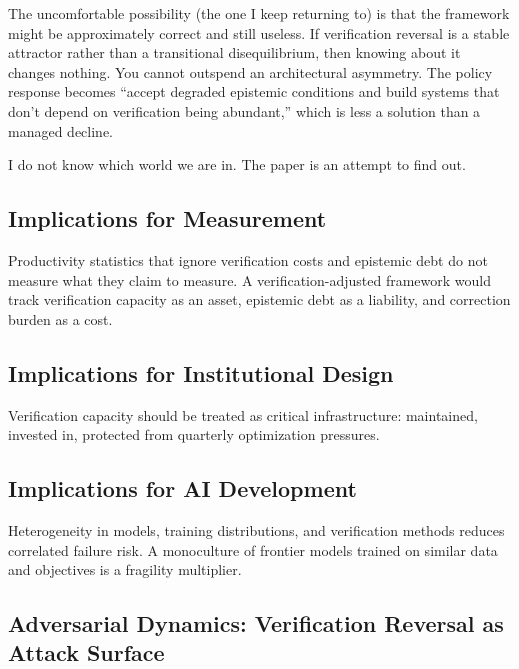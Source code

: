 \documentclass[11pt,a4paper]{article}
\begin{document}
The uncomfortable possibility (the one I keep returning to) is that the framework might be approximately correct and still useless. If verification reversal is a stable attractor rather than a transitional disequilibrium, then knowing about it changes nothing. You cannot outspend an architectural asymmetry. The policy response becomes ``accept degraded epistemic conditions and build systems that don't depend on verification being abundant,'' which is less a solution than a managed decline.

I do not know which world we are in. The paper is an attempt to find out.

\hypertarget{implications-for-measurement}{%
\subsection{ Implications for Measurement}\label{implications-for-measurement}}

Productivity statistics that ignore verification costs and epistemic debt do not measure what they claim to measure. A verification-adjusted framework would track verification capacity as an asset, epistemic debt as a liability, and correction burden as a cost.

\hypertarget{implications-for-institutional-design}{%
\subsection{ Implications for Institutional Design}\label{implications-for-institutional-design}}

Verification capacity should be treated as critical infrastructure: maintained, invested in, protected from quarterly optimization pressures.

\hypertarget{implications-for-ai-development}{%
\subsection{ Implications for AI Development}\label{implications-for-ai-development}}

Heterogeneity in models, training distributions, and verification methods reduces correlated failure risk. A monoculture of frontier models trained on similar data and objectives is a fragility multiplier.

\hypertarget{adversarial-dynamics-verification-reversal-as-attack-surface}{%
\subsection{ Adversarial Dynamics: Verification Reversal as Attack Surface}\label{adversarial-dynamics-verification-reversal-as-attack-surface}}
\end{document}
